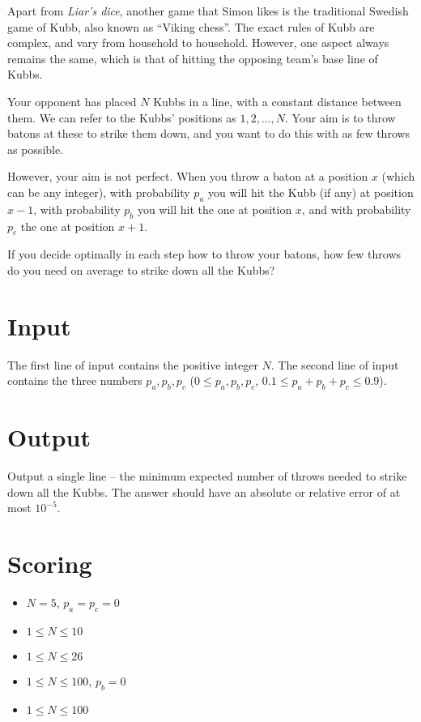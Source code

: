 Apart from \emph{Liar's dice}, another game that Simon likes is the traditional Swedish game of Kubb,
also known as ``Viking chess''.
The exact rules of Kubb are complex, and vary from household to household.
However, one aspect always remains the same, which is that of hitting the opposing team's base line of Kubbs.

Your opponent has placed $N$ Kubbs in a line, with a constant distance between them.
We can refer to the Kubbs' positions as $1, 2, \dots, N$.
Your aim is to throw batons at these to strike them down, and
you want to do this with as few throws as possible.

However, your aim is not perfect. When you throw a baton at a position $x$ (which can be any integer),
with probability $p_a$ you will hit the Kubb (if any) at position $x-1$,
with probability $p_b$ you will hit the one at position $x$, and
with probability $p_c$ the one at position $x+1$.

If you decide optimally in each step how to throw your batons,
how few throws do you need on average to strike down all the Kubbs?

\section*{Input}
The first line of input contains the positive integer $N$.
The second line of input contains the three numbers $p_a, p_b, p_c$ ($0 \le p_a, p_b, p_c$, $0.1 \le p_a + p_b + p_c \le 0.9$).

\section*{Output}
Output a single line -- the minimum expected number of throws needed to strike down all the Kubbs.
The answer should have an absolute or relative error of at most $10^{-5}$.

\section*{Scoring}
\begin{itemize}
  \item $N = 5$, $p_a = p_c = 0$
  \item $1 \le N \le 10$
  \item $1 \le N \le 26$
  \item $1 \le N \le 100$, $p_b = 0$
  \item $1 \le N \le 100$
\end{itemize}

